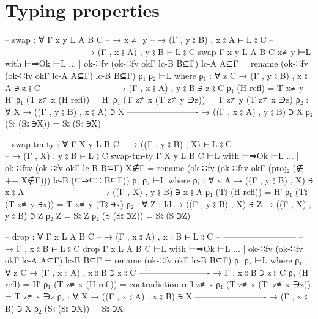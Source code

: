 \documentclass[logo,bsc,singlespacing,parskip,online]{infthesis}
\begin{document}
\section{Typing properties}
\label{appendix:f_type_properties}
\begin{code}
  -- swap : ∀ {Γ x y L A B C}
  --   → x ≢ y
  --   → (Γ , y ⦂ B) , x ⦂ A ⊢ L ⦂ C
  --     -------------------------
  --   → (Γ , x ⦂ A) , y ⦂ B ⊢ L ⦂ C
  swap {Γ} {x} {y} {L} {A} {B} {C} x≢y ⊢L with ⊢⇒Ok ⊢L
  ... | ok-∷fv (ok-∷fv okΓ lc-B B⊆Γ) lc-A A⊆Γ =
    rename (ok-∷fv (ok-∷fv okΓ lc-A A⊆Γ) lc-B B⊆Γ) ρ₁ ρ₂ ⊢L
    where
      ρ₁ : ∀ {z C}
        → (Γ , y ⦂ B) , x ⦂ A ∋ z ⦂ C
          -------------------------
        → (Γ , x ⦂ A) , y ⦂ B ∋ z ⦂ C
      ρ₁ (H refl) = T x≢y H′
      ρ₁ (T z≢x (H refl)) = H′
      ρ₁ (T z≢x (T z≢y ∋z)) = T z≢y (T z≢x ∋z)
      ρ₂ : ∀ {X}
        → ((Γ , y ⦂ B) , x ⦂ A) ∋ X
          -------------------------
        → ((Γ , x ⦂ A) , y ⦂ B) ∋ X
      ρ₂ (S⦂ (S⦂ ∋X)) = S⦂ (S⦂ ∋X)

  -- swap-tm-ty : ∀ {Γ X y L B C}
  --   → ((Γ , y ⦂ B) , X) ⊢ L ⦂ C
  --     -------------------------
  --   → (Γ , X) , y ⦂ B ⊢ L ⦂ C
  swap-tm-ty {Γ} {X} {y} {L} {B} {C} ⊢L with ⊢⇒Ok ⊢L
  ... | ok-∷ftv (ok-∷fv okΓ lc-B B⊆Γ) X∉Γ = rename (ok-∷fv (ok-∷ftv okΓ (proj₂ (∉-++ X∉Γ))) lc-B (⊆⇒⊆∷ B⊆Γ)) ρ₁ ρ₂ ⊢L
    where
      ρ₁ : ∀ {x A}
        → ((Γ , y ⦂ B) , X) ∋ x ⦂ A
          -------------------------
        → ((Γ , X) , y ⦂ B) ∋ x ⦂ A
      ρ₁ (T⦂ (H refl)) = H′
      ρ₁ (T⦂ (T x≢y ∋x)) = T x≢y (T⦂ ∋x)
      ρ₂ : ∀ {Z : Id}
        → ((Γ , y ⦂ B) , X) ∋ Z
        → ((Γ , X) , y ⦂ B) ∋ Z
      ρ₂ Z = S⦂ Z
      ρ₂ (S (S⦂ ∋Z)) = S⦂ (S ∋Z)

  -- drop : ∀ {Γ x L A B C}
  --   → (Γ , x ⦂ A) , x ⦂ B ⊢ L ⦂ C
  --     --------------------------
  --   → Γ , x ⦂ B ⊢ L ⦂ C
  drop {Γ} {x} {L} {A} {B} {C} ⊢L with ⊢⇒Ok ⊢L
  ... | ok-∷fv (ok-∷fv okΓ lc-A A⊆Γ) lc-B B⊆Γ =
    rename (ok-∷fv okΓ lc-B B⊆Γ) ρ₁ ρ₂ ⊢L
    where
      ρ₁ : ∀ {z C}
        → (Γ , x ⦂ A) , x ⦂ B ∋ z ⦂ C
          -------------------------
        → Γ , x ⦂ B ∋ z ⦂ C
      ρ₁ (H refl) = H′
      ρ₁ (T z≢x (H refl)) = contradiction refl z≢x
      ρ₁ (T z≢x (T .z≢x ∋z)) = T z≢x ∋z
      ρ₂ : ∀ {X}
        → ((Γ , x ⦂ A) , x ⦂ B) ∋ X
          -------------------------
        → (Γ , x ⦂ B) ∋ X
      ρ₂ (S⦂ (S⦂ ∋X)) = S⦂ ∋X
\end{code}
\end{document}
